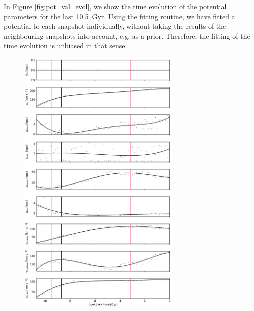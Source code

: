 In Figure \ref{fig:pot_val_evol}, we show the time evolution of the potential parameters for the last \SI{10.5}{Gyr}. Using the fitting routine, we have fitted a potential to each snapshot individually, without taking the results of the neighbouring snapshots into account, e.g. as a prior. Therefore, the fitting of the time evolution is unbiased in that sense. 
\begin{figure}%
\captionsetup{format=plain}
\centering
\includegraphics[width=0.7\textwidth]{plots/Auriga/fitted_potential_evolution_jan19.png}

\end{figure}
